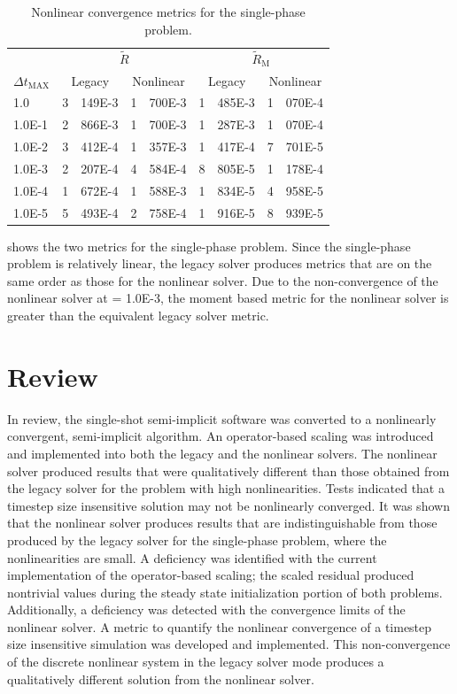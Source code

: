\begin{table}[h!t]
\centering
\begin{tabular}{@{}l r@{.}l r@{.}l r@{.}l r@{.}l @{}}
\toprule
& \multicolumn{4}{c}{$\tilde{R}$} & \multicolumn{4}{c}{$\tilde{R}_{\text{M}}$}  \\
$\Delta t_{\text{MAX}}$ & \multicolumn{2}{c}{Legacy} & \multicolumn{2}{c}{Nonlinear} & \multicolumn{2}{c}{Legacy}& \multicolumn{2}{c}{Nonlinear}  \\
\midrule
1.0    & 3&149E-3 & 1&700E-3 & 1&485E-3 & 1&070E-4 \\
1.0E-1 & 2&866E-3 & 1&700E-3 & 1&287E-3 & 1&070E-4 \\
1.0E-2 & 3&412E-4 & 1&357E-3 & 1&417E-4 & 7&701E-5 \\
1.0E-3 & 2&207E-4 & 4&584E-4 & 8&805E-5 & 1&178E-4 \\
1.0E-4 & 1&672E-4 & 1&588E-3 & 1&834E-5 & 4&958E-5 \\
1.0E-5 & 5&493E-4 & 2&758E-4 & 1&916E-5 & 8&939E-5 \\
\bottomrule  
\end{tabular}
\caption{Nonlinear convergence metrics for the single-phase problem.}
\label{tab:single_criteria}
\end{table}

 shows the two metrics for the single-phase problem.
Since the single-phase problem is relatively linear, the legacy solver produces metrics that are on the same order as those for the nonlinear solver.
Due to the non-convergence of the nonlinear solver at \dtmax{} = 1.0E-3, the moment based metric for the nonlinear solver is greater than the equivalent legacy solver metric.

\section{Review}
\label{sect:review}

In review, the single-shot semi-implicit \cobra{} software was converted to a nonlinearly convergent, semi-implicit algorithm.
An operator-based scaling was introduced and implemented into both the legacy and the nonlinear \cobra{} solvers.
The nonlinear solver produced results that were qualitatively different than those obtained from the legacy solver for the problem with high nonlinearities.
Tests indicated that a timestep size insensitive solution may not be nonlinearly converged.
It was shown that the nonlinear solver produces results that are indistinguishable from those produced by the legacy solver for the single-phase problem,  where the nonlinearities are small.
A deficiency was identified with the current implementation of the operator-based scaling; the scaled residual produced nontrivial values during the steady state initialization portion of both problems.
Additionally, a deficiency was detected with the convergence limits of the nonlinear solver.
A metric to quantify the nonlinear convergence of a timestep size insensitive simulation was developed and implemented.
This non-convergence of the discrete nonlinear system in the legacy solver mode produces a qualitatively different solution from the nonlinear solver.
